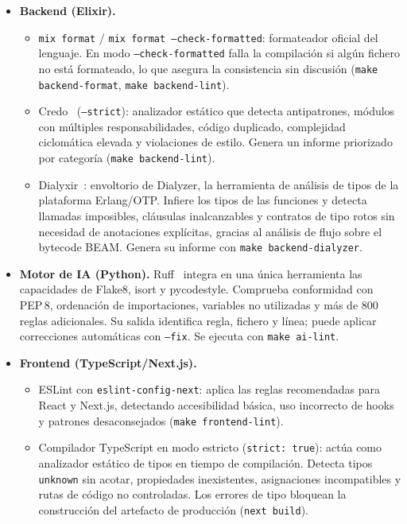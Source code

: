 \begin{itemize}
 \item \textbf{Backend (Elixir).}
 \begin{itemize}
 \item \texttt{mix format} / \texttt{mix format --check-formatted}: formateador oficial del lenguaje. En modo \texttt{--check-formatted} falla la compilación si algún fichero no está formateado, lo que asegura la consistencia sin discusión (\texttt{make backend-format}, \texttt{make backend-lint}).
 \item Credo~\cite{Credo} (\texttt{--strict}): analizador estático que detecta antipatrones, módulos con múltiples responsabilidades, código duplicado, complejidad ciclomática elevada y violaciones de estilo. Genera un informe priorizado por categoría (\texttt{make backend-lint}).
 \item Dialyxir~\cite{Dialyxir}: envoltorio de Dialyzer, la herramienta de análisis de tipos de la plataforma Erlang/OTP. Infiere los tipos de las funciones y detecta llamadas imposibles, cláusulas inalcanzables y contratos de tipo rotos sin necesidad de anotaciones explícitas, gracias al análisis de flujo sobre el bytecode BEAM. Genera su informe con \texttt{make backend-dialyzer}.
 \end{itemize}
 \item \textbf{Motor de IA (Python).} Ruff~\cite{Ruff} integra en una única herramienta las capacidades de Flake8, isort y pycodestyle. Comprueba conformidad con PEP\,8, ordenación de importaciones, variables no utilizadas y más de 800 reglas adicionales. Su salida identifica regla, fichero y línea; puede aplicar correcciones automáticas con \texttt{--fix}. Se ejecuta con \texttt{make ai-lint}.
 \item \textbf{Frontend (TypeScript/Next.js).}
 \begin{itemize}
 \item ESLint con \texttt{eslint-config-next}: aplica las reglas recomendadas para React y Next.js, detectando accesibilidad básica, uso incorrecto de hooks y patrones desaconsejados (\texttt{make frontend-lint}).
 \item Compilador TypeScript en modo estricto (\texttt{strict: true}): actúa como analizador estático de tipos en tiempo de compilación. Detecta tipos \texttt{unknown} sin acotar, propiedades inexistentes, asignaciones incompatibles y rutas de código no controladas. Los errores de tipo bloquean la construcción del artefacto de producción (\texttt{next build}).
 \end{itemize}
\end{itemize}

